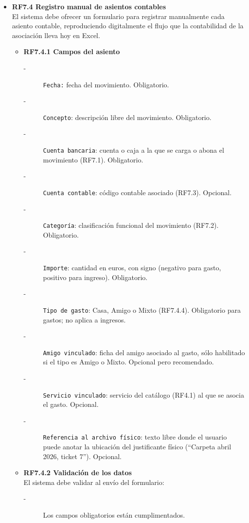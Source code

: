 \begin{itemize}
    \item \textbf{RF7.4 Registro manual de asientos contables} \\
    El sistema debe ofrecer un formulario para registrar manualmente cada
    asiento contable, reproduciendo digitalmente el flujo que la
    contabilidad de la asociación lleva hoy en Excel.
    \begin{itemize}
        \item \textbf{RF7.4.1 Campos del asiento} \\
        \begin{description}
            \item[-] \texttt{Fecha:} fecha del movimiento. Obligatorio.
            \item[-] \texttt{Concepto}: descripción libre del movimiento. Obligatorio.
            \item[-] \texttt{Cuenta bancaria}: cuenta o caja a la que se carga o abona el movimiento (RF7.1). Obligatorio.
            \item[-] \texttt{Cuenta contable}: código contable asociado (RF7.3). Opcional.
            \item[-] \texttt{Categoría}: clasificación funcional del movimiento (RF7.2). Obligatorio.
            \item[-] \texttt{Importe}: cantidad en euros, con signo (negativo para gasto, positivo para ingreso). Obligatorio.
            \item[-] \texttt{Tipo de gasto}: Casa, Amigo o Mixto (RF7.4.4). Obligatorio para gastos; no aplica a ingresos. 
            \item[-] \texttt{Amigo vinculado}: ficha del amigo asociado al gasto, sólo habilitado si el tipo es Amigo o Mixto. Opcional pero recomendado.
            \item[-] \texttt{Servicio vinculado}: servicio del catálogo (RF4.1) al que se asocia el gasto. Opcional.
            \item[-] \texttt{Referencia al archivo físico}: texto libre donde el usuario puede anotar la ubicación del justificante físico (``Carpeta abril 2026, ticket 7''). Opcional.
        \end{description}
        \item \textbf{RF7.4.2 Validación de los datos} \\
        El sistema debe validar al envío del formulario:
        \begin{description}
            \item[-] Los campos obligatorios están cumplimentados.

\end{description}
\end{itemize}
\end{itemize}
